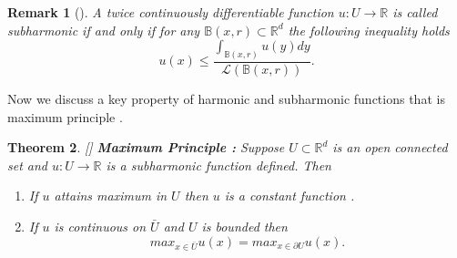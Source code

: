 \documentclass{article}
\numberwithin{equation}{section}
\newtheorem{theorem}{Theorem}[section]
\newtheorem{remark}[theorem]{Remark}
\begin{document}
\begin{remark}[{\cite[Remark 3.4]{PeresMortersBook}}]
A twice continuously differentiable function \(u : U \to \mathbb{R}\) is called subharmonic if and only if for any \(\mathbb{B}(x,r) \subset \mathbb{R}^d\) the following inequality holds
\[
u(x) \leq \frac{\int_{\mathbb{B}(x,r)} u(y)dy}{\mathscr{L}(\mathbb{B}(x,r))}
.\]
\end{remark}
\noindent Now we discuss a key property of harmonic and subharmonic functions that is maximum principle .
\begin{theorem}\label{maximum}
[{\cite[Theorem 3.5]{PeresMortersBook}}]
\textbf{Maximum Principle :} Suppose \(U \subset \mathbb{R}^d\) is an open connected set and \(u : U \to \mathbb{R}\) is a subharmonic function defined. Then 
\begin{enumerate}
  \item If \(u\) attains maximum in \(U\) then \(u\) is a constant function .
 \item If \(u\) is continuous on \(\bar{U}\) and \(U\) is bounded then
 \[
 max_{x \in \bar{U}} u(x) =  max_{x \in \partial{U}} u(x)
. \]  
\end{enumerate}
\end{theorem}
\end{document}
